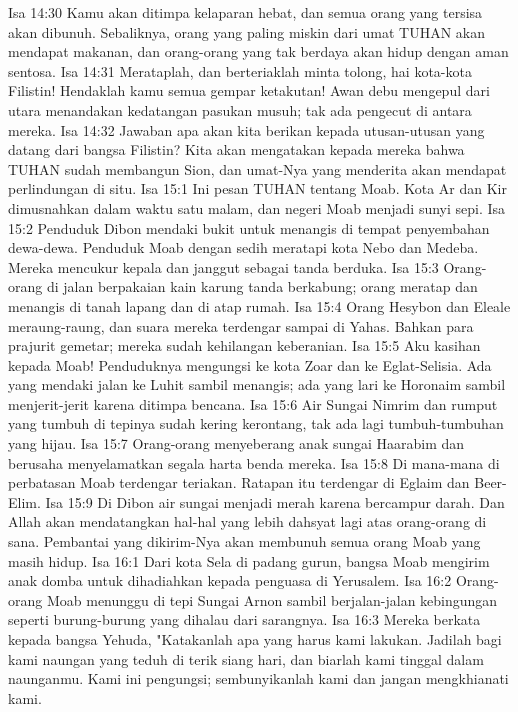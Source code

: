 Isa 14:30  Kamu akan ditimpa kelaparan hebat, dan semua orang yang tersisa akan dibunuh. Sebaliknya, orang yang paling miskin dari umat TUHAN akan mendapat makanan, dan orang-orang yang tak berdaya akan hidup dengan aman sentosa.
Isa 14:31  Merataplah, dan berteriaklah minta tolong, hai kota-kota Filistin! Hendaklah kamu semua gempar ketakutan! Awan debu mengepul dari utara menandakan kedatangan pasukan musuh; tak ada pengecut di antara mereka.
Isa 14:32  Jawaban apa akan kita berikan kepada utusan-utusan yang datang dari bangsa Filistin? Kita akan mengatakan kepada mereka bahwa TUHAN sudah membangun Sion, dan umat-Nya yang menderita akan mendapat perlindungan di situ.
Isa 15:1  Ini pesan TUHAN tentang Moab. Kota Ar dan Kir dimusnahkan dalam waktu satu malam, dan negeri Moab menjadi sunyi sepi.
Isa 15:2  Penduduk Dibon mendaki bukit untuk menangis di tempat penyembahan dewa-dewa. Penduduk Moab dengan sedih meratapi kota Nebo dan Medeba. Mereka mencukur kepala dan janggut sebagai tanda berduka.
Isa 15:3  Orang-orang di jalan berpakaian kain karung tanda berkabung; orang meratap dan menangis di tanah lapang dan di atap rumah.
Isa 15:4  Orang Hesybon dan Eleale meraung-raung, dan suara mereka terdengar sampai di Yahas. Bahkan para prajurit gemetar; mereka sudah kehilangan keberanian.
Isa 15:5  Aku kasihan kepada Moab! Penduduknya mengungsi ke kota Zoar dan ke Eglat-Selisia. Ada yang mendaki jalan ke Luhit sambil menangis; ada yang lari ke Horonaim sambil menjerit-jerit karena ditimpa bencana.
Isa 15:6  Air Sungai Nimrim dan rumput yang tumbuh di tepinya sudah kering kerontang, tak ada lagi tumbuh-tumbuhan yang hijau.
Isa 15:7  Orang-orang menyeberang anak sungai Haarabim dan berusaha menyelamatkan segala harta benda mereka.
Isa 15:8  Di mana-mana di perbatasan Moab terdengar teriakan. Ratapan itu terdengar di Eglaim dan Beer-Elim.
Isa 15:9  Di Dibon air sungai menjadi merah karena bercampur darah. Dan Allah akan mendatangkan hal-hal yang lebih dahsyat lagi atas orang-orang di sana. Pembantai yang dikirim-Nya akan membunuh semua orang Moab yang masih hidup.
Isa 16:1  Dari kota Sela di padang gurun, bangsa Moab mengirim anak domba untuk dihadiahkan kepada penguasa di Yerusalem.
Isa 16:2  Orang-orang Moab menunggu di tepi Sungai Arnon sambil berjalan-jalan kebingungan seperti burung-burung yang dihalau dari sarangnya.
Isa 16:3  Mereka berkata kepada bangsa Yehuda, "Katakanlah apa yang harus kami lakukan. Jadilah bagi kami naungan yang teduh di terik siang hari, dan biarlah kami tinggal dalam naunganmu. Kami ini pengungsi; sembunyikanlah kami dan jangan mengkhianati kami.
